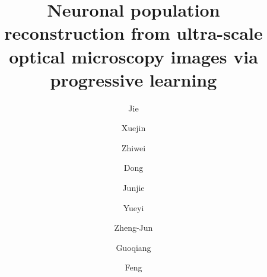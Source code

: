 \documentclass[times,twocolumn,final]{elsarticle}
\begin{document}
	

\begin{frontmatter}

\title{Neuronal population reconstruction from ultra-scale optical microscopy images via progressive learning}                       

\author{Jie }
\author{Xuejin }
\author{Zhiwei }
\author{Dong }
\author{Junjie  }
\author{Yueyi }
\author{Zheng-Jun }
\author{Guoqiang }
\author{Feng }

\address{National Engineering Laboratory for Brain-inspired Intelligence Technology and Application, University of Science and Technology of China, No. 96 Jinzhai Road, Hefei, Anhui, 230026, China} 



\end{frontmatter}
\end{document}
